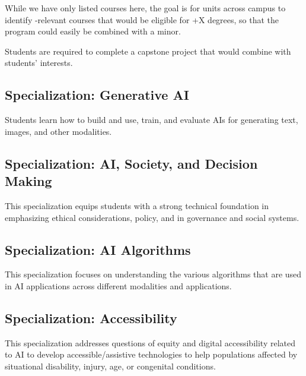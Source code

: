 \documentclass[
10pt, %
a4paper, %
oneside, %
headinclude,footinclude, %
BCOR5mm, %
]{scrartcl}
\begin{document}


While we have only listed  courses here, the goal is for units across campus to identify \ai{}-relevant courses that would be eligible for \ai{}+X degrees, so that the \ai{} program could easily be combined with a minor.

Students are required to complete a capstone project that would combine \ai{} with students' interests.

\subsection{Specialization: Generative AI}

    Students learn how to build and use, train, and evaluate AIs for generating text, images, and other modalities.


  

\subsection{Specialization: AI, Society, and Decision Making}

This specialization equips students with a strong technical foundation in \ai{} emphasizing ethical considerations, policy, and \ai{} in governance and social systems.



\subsection{Specialization: AI Algorithms}

This specialization focuses on understanding the various algorithms that are used in AI applications across different modalities and applications.



\subsection{Specialization: Accessibility}

This specialization addresses questions of equity and digital accessibility related to AI to develop accessible/assistive technologies to help populations affected by situational disability, injury, age, or congenital conditions.


\end{document}
